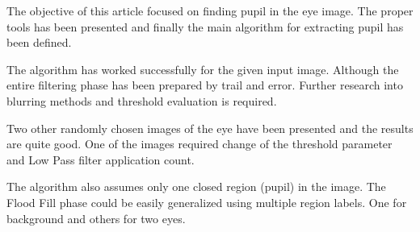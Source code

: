 \documentclass{article}
\begin{document}
The objective of this article focused on finding pupil in the eye image. The proper tools has been presented and finally the main algorithm for extracting pupil has been defined.

The algorithm has worked successfully for the given input image. Although the entire filtering phase has been prepared by trail and error. Further research into blurring methods and threshold evaluation is required. 

Two other randomly chosen images of the eye have been presented and the results are quite good. One of the images required change of the threshold parameter and Low Pass filter application count.


The algorithm also assumes only one closed region (pupil) in the image. The Flood Fill phase could be easily generalized using multiple region labels. One for background and others for two eyes.







\end{document}
